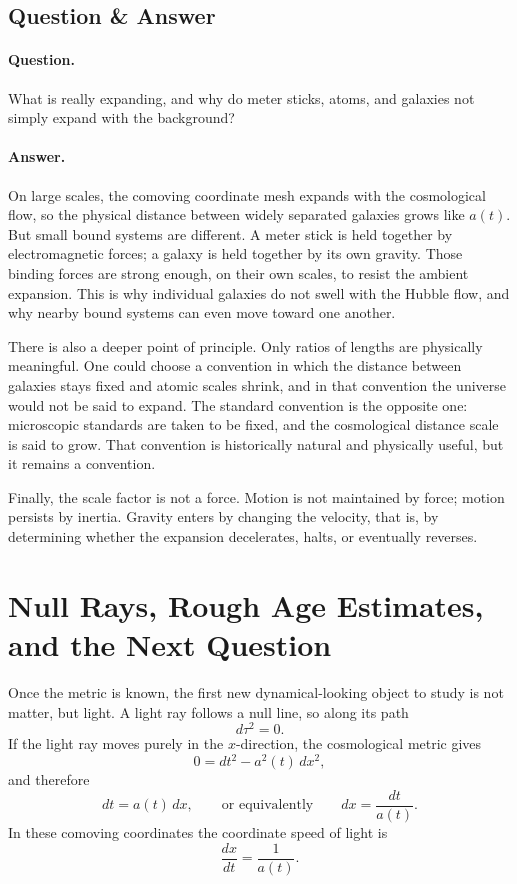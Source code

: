 \subsection{Question \& Answer}

\paragraph{Question.} What is really expanding, and why do meter sticks, atoms, and galaxies not simply expand with the background?

\paragraph{Answer.} On large scales, the comoving coordinate mesh expands with the cosmological flow, so the physical distance between widely separated galaxies grows like \(a(t)\). But small bound systems are different. A meter stick is held together by electromagnetic forces; a galaxy is held together by its own gravity. Those binding forces are strong enough, on their own scales, to resist the ambient expansion. This is why individual galaxies do not swell with the Hubble flow, and why nearby bound systems can even move toward one another.

There is also a deeper point of principle. Only ratios of lengths are physically meaningful. One could choose a convention in which the distance between galaxies stays fixed and atomic scales shrink, and in that convention the universe would not be said to expand. The standard convention is the opposite one: microscopic standards are taken to be fixed, and the cosmological distance scale is said to grow. That convention is historically natural and physically useful, but it remains a convention.

Finally, the scale factor is not a force. Motion is not maintained by force; motion persists by inertia. Gravity enters by changing the velocity, that is, by determining whether the expansion decelerates, halts, or eventually reverses.

\section{Null Rays, Rough Age Estimates, and the Next Question}

Once the metric is known, the first new dynamical-looking object to study is not matter, but light. A light ray follows a null line, so along its path
\begin{equation}
d\tau^2 = 0.
\end{equation}
If the light ray moves purely in the \(x\)-direction, the cosmological metric gives
\begin{equation}
0 = dt^2 - a^2(t)\,dx^2,
\end{equation}
and therefore
\begin{equation}
dt = a(t)\,dx,
\qquad\text{or equivalently}\qquad
dx = \frac{dt}{a(t)}.
\end{equation}
In these comoving coordinates the coordinate speed of light is
\begin{equation}
\frac{dx}{dt} = \frac{1}{a(t)}.
\end{equation}

